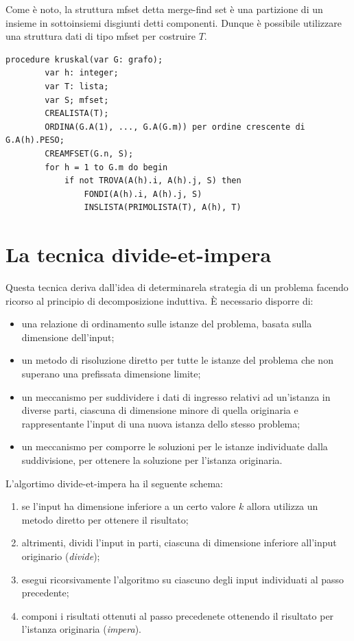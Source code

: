 \documentclass[12pt]{report}
\begin{document}
  Come è noto, la struttura mfset detta merge-find set è una partizione di un insieme in sottoinsiemi disgiunti detti componenti. Dunque è possibile utilizzare una struttura dati di tipo mfset per costruire $T$.
 	\begin{lstlisting}[style=pascalstyle]
 	procedure kruskal(var G: grafo);
 		var h: integer;
 		var T: lista;
 		var S; mfset;
 		CREALISTA(T);
 		ORDINA(G.A(1), ..., G.A(G.m)) per ordine crescente di G.A(h).PESO;
 		CREAMFSET(G.n, S);
 		for h = 1 to G.m do begin
 			if not TROVA(A(h).i, A(h).j, S) then
 				FONDI(A(h).i, A(h).j, S)
 				INSLISTA(PRIMOLISTA(T), A(h), T)
 	\end{lstlisting}
 	\section{La tecnica divide-et-impera}
 	Questa tecnica deriva dall'idea di determinarela strategia di un problema facendo ricorso al principio di decomposizione induttiva. È necessario disporre di:
 	\begin{itemize}
 		\item una relazione di ordinamento sulle istanze del problema, basata sulla dimensione dell'input;
 		\item un metodo di risoluzione diretto per tutte le istanze del problema che non superano una prefissata dimensione limite;
 		\item un meccanismo per suddividere i dati di ingresso relativi ad un'istanza in diverse parti, ciascuna di dimensione minore di quella originaria e rappresentante l'input di una nuova istanza dello stesso problema;
 		\item un meccanismo per comporre le soluzioni per le istanze individuate dalla suddivisione, per ottenere la soluzione per l'istanza originaria.
 	\end{itemize}
 	L'algortimo divide-et-impera ha il seguente schema:
 	\begin{enumerate}
 		\item se l'input ha dimensione inferiore a un certo valore $k$ allora utilizza un metodo diretto per ottenere il risultato;
 		\item altrimenti, dividi l'input in parti, ciascuna di dimensione inferiore all'input originario (\textit{divide});
 		\item esegui ricorsivamente l'algoritmo su ciascuno degli input individuati al passo precedente;
 		\item componi i risultati ottenuti al passo precedenete ottenendo il risultato per l'istanza originaria (\textit{impera}).
 	\end{enumerate}
\end{document}
